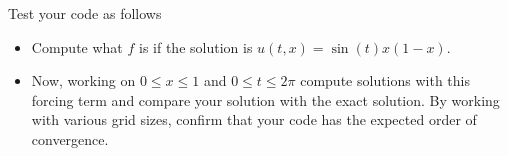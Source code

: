 \documentclass[minion]{homework}
\begin{document}
\begin{problems}
Test your code as follows

\begin{itemize}  
\item Compute what $f$ is if the solution is $u(t,x)=\sin(t)x(1-x)$.  
\item Now, working on $0\le x\le 1$ and $0\le t\le 2\pi$ 
compute solutions with this forcing term and compare your solution
with the exact solution.  By working with various grid sizes,
confirm that your code has the expected order of convergence.
\end{itemize}

\end{problems}
\end{document}
